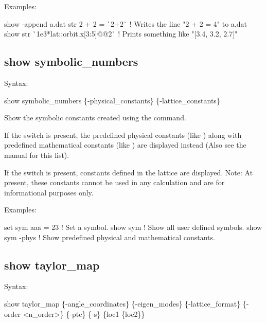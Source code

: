 {{{{{{{{{Examples:
\begin{example}
  show -append a.dat str 2 + 2 = \`{}2+2\`{} ! Writes the line "2 + 2 = 4" to a.dat
  show str \`{}1e3*lat::orbit.x[3:5]@@2\`{}  ! Prints something like "[3.4, 3.2, 2.7]"
\end{example}


\subsection{show symbolic_numbers}
\label{s:show.symbolic}

Syntax:
\begin{example}
  show symbolic_numbers \{-physical_constants\} \{-lattice_constants\}
\end{example}

Show the symbolic constants created using the  command. 

If the  switch is present, the predefined physical constants (like
) along with predefined mathematical constants (like ) are displayed instead
(Also see the \bmad manual for this list).

If the  switch is present, constants defined in the lattice are displayed.
Note: At present, these constants cannot be used in any calculation and are for informational
purposes only.

Examples:
\begin{example}
  set sym aaa = 23  ! Set a symbol.
  show sym          ! Show all user defined symbols.
  show sym -phys    ! Show predefined physical and mathematical constants.
\end{example}


\subsection{show taylor_map}
\label{s:show.taylor}

Syntax:
\begin{example}
  show taylor_map \{-angle_coordinates\} \{-eigen_modes\} \{-lattice_format\} 
                  \{-order <n_order>\} \{-ptc\} \{-s\} \{loc1 \{loc2\}\}
\end{example}

}}}}}}}}}
